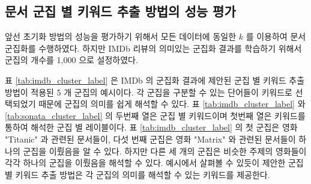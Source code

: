 \documentclass[oneside, ko,phd]{snuthesis_utf8_kor}
\begin{document}
\subsection{문서 군집 별 키워드 추출 방법의 성능 평가}

앞선 초기화 방법의 성능을 평가하기 위해서 모든 데이터에 동일한 $k$ 를 이용하여 문서 군집화를 수행하였다.
하지만 IMDb 리뷰의 의미있는 군집화 결과를 학습하기 위해서 군집의 개수를 1,000 으로 설정하였다.

표 \ref{tab:imdb_cluster_label} 은 IMDb 의 군집화 결과에 제안된 군집 별 키워드 추출 방법이 적용된 5 개 군집의 예시이다.
각 군집을 구분할 수 있는 단어들이 키워드로 선택되었기 때문에 군집의 의미를 쉽게 해석할 수 있다.
표 \ref{tab:imdb_cluster_label} 와 \ref{tab:sonata_cluster_label} 의 두번째 열은 군집 별 키워드이며 첫번째 열은 키워드를 통하여 해석한 군집 별 레이블이다.
표 \ref{tab:imdb_cluster_label} 의 첫 군집은 영화 "Titanic" 과 관련된 문서들이, 다섯 번째 군집은 영화 "Matrix" 와 관련된 문서들이 하나의 군집을 이뤘음을 알 수 있다.
하지만 다른 세 개의 군집은 비슷한 주제의 영화들이 각각 하나의 군집을 이뤘음을 해석할 수 있다.
예시에서 살펴볼 수 있듯이 제안한 군집 별 키워드 추출 방법은 각 군집의 의미를 해석할 수 있는 키워드를 제공한다.
\end{document}
